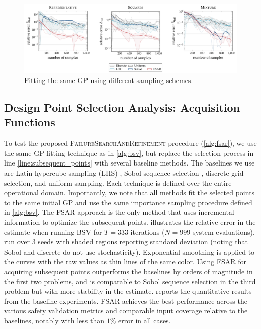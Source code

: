 \begin{figure}[b!]
    \centering
    \includegraphics[width=\textwidth]{figures/bsv/toys/baseline_sampling_schemes.pdf}
    \caption{Fitting the same GP using different sampling schemes.}
    \label{fig:sampling}
\end{figure}


\subsection{Design Point Selection Analysis: Acquisition Functions}

To test the proposed \textsc{FailureSearchAndRefinement} procedure (\cref{alg:fsar}),
we use the same GP fitting technique as in \cref{alg:bsv}, but replace the selection process in line \ref*{line:subsequent_points} with several baseline methods.
The baselines we use are Latin hypercube sampling (LHS) \cite{mckay1979latin}, Sobol sequence selection \cite{sobol1967distribution}, discrete grid selection, and uniform sampling.
Each technique is defined over the entire operational domain.
Importantly, we note that all methods fit the selected points to the same initial GP and use the same importance sampling procedure defined in \cref{alg:bsv}.
The FSAR approach is the only method that uses incremental information to optimize the subsequent points.
 illustrates the relative error in the estimate when running BSV for $T=333$ iterations ($N=999$ system evaluations), run over $3$ seeds with shaded regions reporting standard deviation (noting that Sobol and discrete do not use stochasticity).
Exponential smoothing is applied to the curves with the raw values as thin lines of the same color.
Using FSAR for acquiring subsequent points outperforms the baselines by orders of magnitude in the first two problems, and is comparable to Sobol sequence selection in the third problem but with more stability in the estimate.
 reports the quantitative results from the baseline experiments.
FSAR achieves the best performance across the various safety validation metrics and comparable input coverage relative to the baselines, notably with less than $1\%$ error in all cases.


